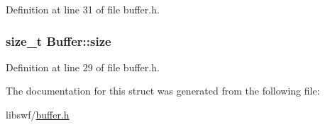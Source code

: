 Definition at line 31 of file buffer.\-h.

\hypertarget{struct_buffer_a24e94f119f4b386771c78cf37aaff41b}{
\subsubsection[{size}]{\setlength{\rightskip}{0pt plus 5cm}size\-\_\-t Buffer\-::size}}\label{struct_buffer_a24e94f119f4b386771c78cf37aaff41b}


Definition at line 29 of file buffer.\-h.



The documentation for this struct was generated from the following file\-:\begin{DoxyCompactItemize}
\item 
libswf/\hyperlink{buffer_8h}{buffer.\-h}\end{DoxyCompactItemize}

